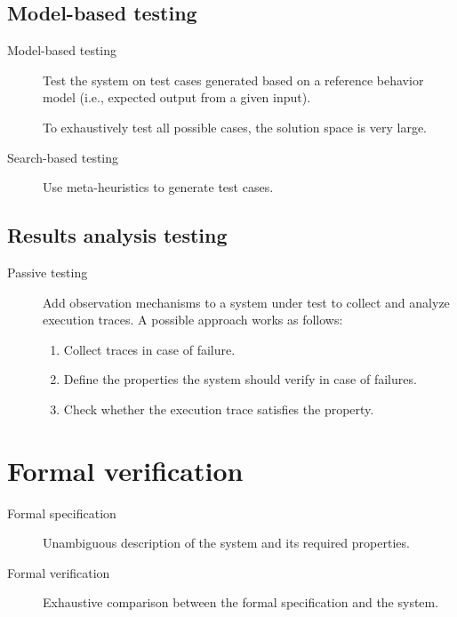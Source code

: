 \subsection{Model-based testing}

\begin{description}
    \item[Model-based testing] 
        Test the system on test cases generated based on a reference behavior model (i.e., expected output from a given input).

        \begin{remark}
            To exhaustively test all possible cases, the solution space is very large.
        \end{remark}

    \item[Search-based testing] 
        Use meta-heuristics to generate test cases.
\end{description}


\subsection{Results analysis testing}

\begin{description}
    \item[Passive testing] 
        Add observation mechanisms to a system under test to collect and analyze execution traces. A possible approach works as follows:
        \begin{enumerate}
            \item Collect traces in case of failure.
            \item Define the properties the system should verify in case of failures.
            \item Check whether the execution trace satisfies the property.
        \end{enumerate}
\end{description}



\section{Formal verification}

\begin{description}
    \item[Formal specification] 
        Unambiguous description of the system and its required properties.

    \item[Formal verification] 
        Exhaustive comparison between the formal specification and the system.
\end{description}


